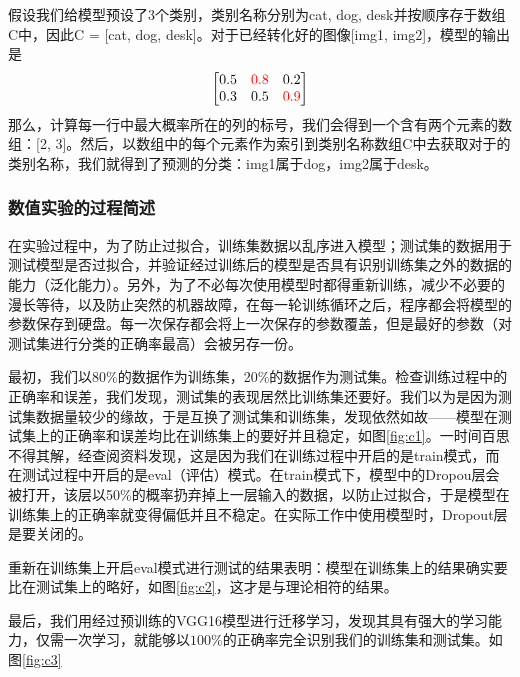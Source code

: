 假设我们给模型预设了3个类别，类别名称分别为cat, dog, desk并按顺序存于数组C中，因此C = [cat, dog, desk]。对于已经转化好的图像[img1, img2]，模型的输出是
\begin{equation*}\label{equ:example}
	\begin{bmatrix}
		0.5 & {\color{red} 0.8} & 0.2\\
		0.3 & 0.5 & {\color{red} 0.9}
	\end{bmatrix}
\end{equation*}
那么，计算每一行中最大概率所在的列的标号，我们会得到一个含有两个元素的数组：[2, 3]。然后，以数组中的每个元素作为索引到类别名称数组C中去获取对于的类别名称，我们就得到了预测的分类：img1属于dog，img2属于desk。

\subsubsection{数值实验的过程简述}
在实验过程中，为了防止过拟合\cite{DL, DLWP}，训练集数据以乱序进入模型；测试集的数据用于测试模型是否过拟合，并验证经过训练后的模型是否具有识别训练集之外的数据的能力（泛化能力）。另外，为了不必每次使用模型时都得重新训练，减少不必要的漫长等待，以及防止突然的机器故障，在每一轮训练循环之后，程序都会将模型的参数保存到硬盘。每一次保存都会将上一次保存的参数覆盖，但是最好的参数（对测试集进行分类的正确率最高）会被另存一份。

最初，我们以80\%的数据作为训练集，20\%的数据作为测试集。检查训练过程中的正确率和误差，我们发现，测试集的表现居然比训练集还要好。我们以为是因为测试集数据量较少的缘故，于是互换了测试集和训练集，发现依然如故——模型在测试集上的正确率和误差均比在训练集上的要好并且稳定，如图\ref{fig:c1}。一时间百思不得其解，经查阅资料发现，这是因为我们在训练过程中开启的是train模式\cite{DLWP}，而在测试过程中开启的是eval（评估）模式\cite{DLWP}。在train模式下，模型中的Dropou层\cite{DL}会被打开，该层以50\%的概率扔弃掉上一层输入的数据，以防止过拟合，于是模型在训练集上的正确率就变得偏低并且不稳定。在实际工作中使用模型时，Dropout层是要关闭的。

重新在训练集上开启eval模式进行测试的结果表明：模型在训练集上的结果确实要比在测试集上的略好，如图\ref{fig:c2}，这才是与理论相符的结果。

最后，我们用经过预训练的VGG16模型进行迁移学习\cite{DL}，发现其具有强大的学习能力，仅需一次学习，就能够以$100\%$的正确率完全识别我们的训练集和测试集。如图\ref{fig:c3}

